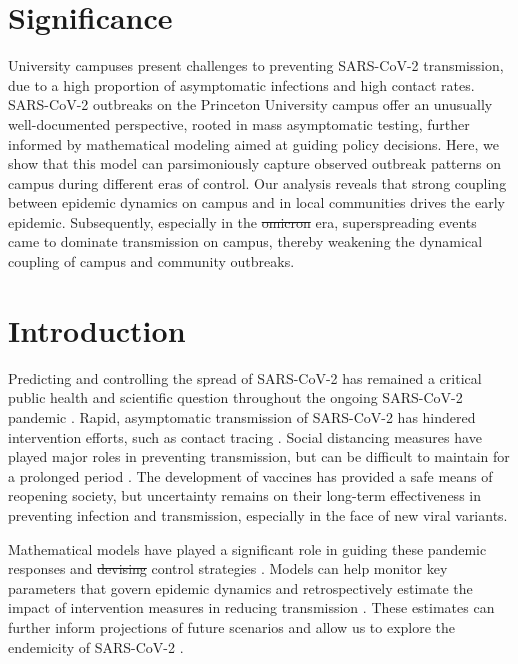 \documentclass[12pt]{article}
\providecommand{\DIFaddtex}[1]{{\protect\color{blue}\uwave{#1}}} %
\providecommand{\DIFdeltex}[1]{{\protect\color{red}\sout{#1}}}                      %
\providecommand{\DIFaddbegin}{} %
\providecommand{\DIFaddend}{} %
\providecommand{\DIFdelbegin}{} %
\providecommand{\DIFdelend}{} %
\providecommand{\DIFadd}[1]{\texorpdfstring{\DIFaddtex{#1}}{#1}} %
\providecommand{\DIFdel}[1]{\texorpdfstring{\DIFdeltex{#1}}{}} %
\newcommand{\DIFscaledelfig}{0.5}
\newlength{\DIFdelgraphicswidth} %
\newlength{\DIFdelgraphicsheight} %
\newcommand{\DIFaddincludegraphics}[2][]{{\color{blue}\fbox{\DIFOincludegraphics[#1]{#2}}}} %
\newcommand{\DIFdelincludegraphics}[2][]{%
\sbox{\DIFdelgraphicsbox}{\DIFOincludegraphics[#1]{#2}}%
\settoboxwidth{\DIFdelgraphicswidth}{\DIFdelgraphicsbox} %
\settoboxtotalheight{\DIFdelgraphicsheight}{\DIFdelgraphicsbox} %
\scalebox{\DIFscaledelfig}{%
\parbox[b]{\DIFdelgraphicswidth}{\usebox{\DIFdelgraphicsbox}\\[-\baselineskip] \rule{\DIFdelgraphicswidth}{0em}}\llap{\resizebox{\DIFdelgraphicswidth}{\DIFdelgraphicsheight}{%
\setlength{\unitlength}{\DIFdelgraphicswidth}%
\begin{picture}(1,1)%
\thicklines\linethickness{2pt} %
{\color[rgb]{1,0,0}\put(0,0){\framebox(1,1){}}}%
{\color[rgb]{1,0,0}\put(0,0){\line( 1,1){1}}}%
{\color[rgb]{1,0,0}\put(0,1){\line(1,-1){1}}}%
\end{picture}%
}\hspace*{3pt}}} %
} %
\DeclareRobustCommand{\DIFaddbegin}{\DIFOaddbegin \let\includegraphics\DIFaddincludegraphics} %
\DeclareRobustCommand{\DIFaddend}{\DIFOaddend \let\includegraphics\DIFOincludegraphics} %
\DeclareRobustCommand{\DIFdelbegin}{\DIFOdelbegin \let\includegraphics\DIFdelincludegraphics} %
\DeclareRobustCommand{\DIFdelend}{\DIFOaddend \let\includegraphics\DIFOincludegraphics} %
\begin{document}
\section*{Significance}

University campuses present challenges to preventing SARS-CoV-2 transmission, due to a high proportion of asymptomatic infections and high contact rates. SARS-CoV-2 outbreaks on the Princeton University campus offer an unusually well-documented perspective, rooted in mass asymptomatic testing, further informed by mathematical modeling aimed at guiding policy decisions. Here, we show that this model can parsimoniously capture observed outbreak patterns on campus during different eras of control. Our analysis reveals that strong coupling between epidemic dynamics on campus and in local communities drives the early epidemic. Subsequently, especially in the \DIFdelbegin \DIFdel{omicron }\DIFdelend \DIFaddbegin \DIFadd{Omicron }\DIFaddend era, superspreading events came to dominate transmission on campus, thereby weakening the dynamical coupling of campus and community outbreaks.

\pagebreak

\section*{Introduction}

Predicting and controlling the spread of SARS-CoV-2 has remained a critical public health and scientific question throughout the ongoing SARS-CoV-2 pandemic \citep{baker2021limits}.
Rapid, asymptomatic transmission of SARS-CoV-2 has hindered intervention efforts, such as contact tracing \citep{hellewell2020feasibility}.
Social distancing measures have played major roles in preventing transmission, but can be difficult to maintain for a prolonged period \citep{galanti2021social}.
The development of vaccines has provided a safe means of reopening society, but uncertainty remains on their long-term effectiveness in preventing infection and transmission, especially in the face of new viral variants.

Mathematical models have played a significant role in guiding these pandemic responses and \DIFdelbegin \DIFdel{devising }\DIFdelend \DIFaddbegin \DIFadd{exploring }\DIFaddend control strategies \citep{cobey2020modeling,holmdahl2020wrong,metcalf2020mathematical,koelle2022changing}.
Models can help monitor key parameters that govern epidemic dynamics \citep{kraemer2021monitoring} and retrospectively estimate the impact of intervention measures in reducing transmission \citep{flaxman2020estimating}.
These estimates can further inform projections of future scenarios and allow us to explore the endemicity of SARS-CoV-2 \citep{kissler2020projecting,saad2020immune,lavine2021immunological,saad2021epidemiological}.
\end{document}
